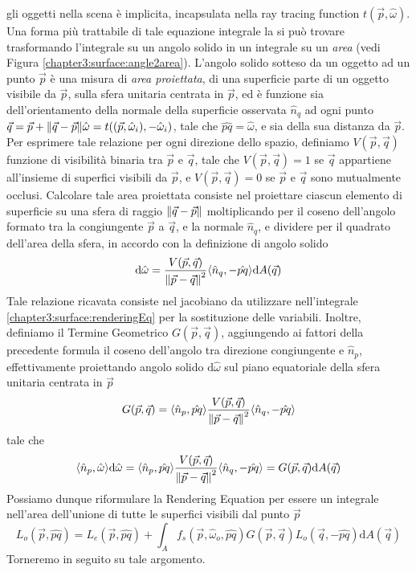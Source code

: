 gli oggetti nella scena \`e implicita, incapsulata nella ray tracing function $t(\vec{p}, \hat{\omega})$. Una forma pi\`u trattabile di tale equazione
integrale la si pu\`o trovare trasformando l'integrale su un angolo solido in un integrale su un \textit{area} (vedi Figura 
\ref{chapter3:surface:angle2area}). L'angolo solido sotteso da un oggetto ad un punto $\vec{p}$ \`e una misura di \textit{area proiettata}, di una 
superficie parte di un oggetto visibile da $\vec{p}$, sulla sfera unitaria centrata in $\vec{p}$, ed \`e funzione sia dell'orientamento della normale 
della superficie osservata $\hat{n}_q$ ad ogni punto $\vec{q}=\vec{p}+\norm{\vec{q}-\vec{p}}\hat{\omega}=t((\vec{p}, \hat{\omega}_i),-\hat{\omega}_i)$, 
tale che $\hat{pq}=\hat{\omega}$, e sia della sua distanza da $\vec{p}$. Per esprimere tale relazione per ogni direzione dello spazio, definiamo 
$V(\vec{p},\vec{q})$ funzione di visibilit\`a binaria tra $\vec{p}$ e $\vec{q}$, tale che $V(\vec{p},\vec{q})=1$ se $\vec{q}$ appartiene all'insieme 
di superfici visibili da $\vec{p}$, e $V(\vec{p},\vec{q})=0$ se $\vec{p}$ e $\vec{q}$ sono mutualmente occlusi. Calcolare tale area proiettata consiste
nel proiettare ciascun elemento di superficie su una sfera di raggio $\norm{\vec{q}-\vec{p}}$ moltiplicando per il coseno dell'angolo formato tra la 
congiungente $\vec{p}$ a $\vec{q}$, e la normale $\hat{n}_q$, e dividere per il quadrato dell'area della sfera, in accordo con la definizione di 
angolo solido
\begin{equation}
	\mathrm{d}\hat{\omega}=\frac{V(\vec{p},\vec{q})}{\norm{\vec{p}-\vec{q}}^2}\langle\hat{n}_q,-\hat{pq}\rangle\mathrm{d}A(\vec{q})
\end{equation}
Tale relazione ricavata consiste nel jacobiano da utilizzare nell'integrale \ref{chapter3:surface:renderingEq} per la sostituzione delle variabili.
Inoltre, definiamo il Termine Geometrico $G(\vec{p},\vec{q})$, aggiungendo ai fattori della precedente formula il coseno dell'angolo tra direzione 
congiungente e $\hat{n}_p$, effettivamente proiettando angolo solido $\mathrm{d}\hat{\omega}$ sul piano equatoriale della sfera unitaria
centrata in $\vec{p}$
\begin{equation}\label{chapter3:surface:geometricTerm}
	G(\vec{p},\vec{q}) = \langle\hat{n}_p,\hat{pq}\rangle\frac{V(\vec{p},\vec{q})}{\norm{\vec{p}-\vec{q}}^2}\langle\hat{n}_q,-\hat{pq}\rangle
\end{equation}
tale che
\begin{equation}
	\langle\hat{n}_p,\hat{\omega}\rangle\mathrm{d}\hat{\omega} = %
		\langle\hat{n}_p,\hat{pq}\rangle\frac{V(\vec{p},\vec{q})}{\norm{\vec{p}-\vec{q}}^2}\langle\hat{n}_q,-\hat{pq}\rangle = %
		G(\vec{p},\vec{q})\mathrm{d}A(\vec{q})
\end{equation}
Possiamo dunque riformulare la Rendering Equation per essere un integrale nell'area dell'unione di tutte le superfici visibili dal punto $\vec{p}$
\begin{equation}
	L_o(\vec{p},\hat{pq}) %
		= L_e(\vec{p},\hat{pq}) + \int_{A}f_s(\vec{p},\hat{\omega}_o,\hat{pq})G(\vec{p},\vec{q})L_o(\vec{q},-\hat{pq})\mathrm{d}A(\vec{q})
\end{equation}
Torneremo in seguito su tale argomento.

